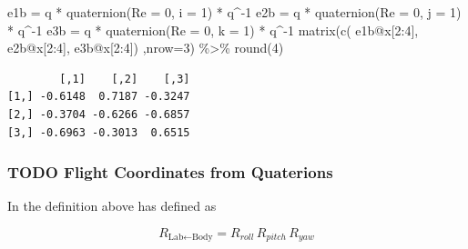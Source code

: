 \documentclass[
  letterpaper,
  DIV=11,
  numbers=noendperiod]{scrartcl}
\newenvironment{Shaded}{\begin{snugshade}}{\end{snugshade}}
\newcommand{\AttributeTok}[1]{\textcolor[rgb]{0.40,0.45,0.13}{#1}}
\newcommand{\DecValTok}[1]{\textcolor[rgb]{0.68,0.00,0.00}{#1}}
\newcommand{\FunctionTok}[1]{\textcolor[rgb]{0.28,0.35,0.67}{#1}}
\newcommand{\NormalTok}[1]{\textcolor[rgb]{0.00,0.23,0.31}{#1}}
\newcommand{\OtherTok}[1]{\textcolor[rgb]{0.00,0.23,0.31}{#1}}
\newcommand{\SpecialCharTok}[1]{\textcolor[rgb]{0.37,0.37,0.37}{#1}}
\begin{document}
\begin{Shaded}
\begin{Highlighting}[]
\NormalTok{ e1b }\OtherTok{=}\NormalTok{ q }\SpecialCharTok{*} \FunctionTok{quaternion}\NormalTok{(}\AttributeTok{Re =} \DecValTok{0}\NormalTok{, }\AttributeTok{i =} \DecValTok{1}\NormalTok{) }\SpecialCharTok{*}\NormalTok{ q}\SpecialCharTok{\^{}{-}}\DecValTok{1} 
\NormalTok{ e2b }\OtherTok{=}\NormalTok{ q }\SpecialCharTok{*} \FunctionTok{quaternion}\NormalTok{(}\AttributeTok{Re =} \DecValTok{0}\NormalTok{, }\AttributeTok{j =} \DecValTok{1}\NormalTok{) }\SpecialCharTok{*}\NormalTok{ q}\SpecialCharTok{\^{}{-}}\DecValTok{1} 
\NormalTok{ e3b }\OtherTok{=}\NormalTok{ q }\SpecialCharTok{*} \FunctionTok{quaternion}\NormalTok{(}\AttributeTok{Re =} \DecValTok{0}\NormalTok{, }\AttributeTok{k =} \DecValTok{1}\NormalTok{) }\SpecialCharTok{*}\NormalTok{ q}\SpecialCharTok{\^{}{-}}\DecValTok{1} 
 \FunctionTok{matrix}\NormalTok{(}\FunctionTok{c}\NormalTok{(}
\NormalTok{          e1b}\SpecialCharTok{@}\NormalTok{x[}\DecValTok{2}\SpecialCharTok{:}\DecValTok{4}\NormalTok{],}
\NormalTok{          e2b}\SpecialCharTok{@}\NormalTok{x[}\DecValTok{2}\SpecialCharTok{:}\DecValTok{4}\NormalTok{],}
\NormalTok{          e3b}\SpecialCharTok{@}\NormalTok{x[}\DecValTok{2}\SpecialCharTok{:}\DecValTok{4}\NormalTok{])}
\NormalTok{ ,}\AttributeTok{nrow=}\DecValTok{3}\NormalTok{) }\SpecialCharTok{\%\textgreater{}\%} \FunctionTok{round}\NormalTok{(}\DecValTok{4}\NormalTok{)}
\end{Highlighting}
\end{Shaded}

\begin{verbatim}
        [,1]    [,2]    [,3]
[1,] -0.6148  0.7187 -0.3247
[2,] -0.3704 -0.6266 -0.6857
[3,] -0.6963 -0.3013  0.6515
\end{verbatim}

\hypertarget{todo-flight-coordinates-from-quaterions}{%
\subsubsection{TODO Flight Coordinates from
Quaterions}\label{todo-flight-coordinates-from-quaterions}}

In the definition above has defined as

\[
  R_{\text{Lab} \leftarrow \text{Body}} =  R_{roll} \, R_{pitch}\, R_{yaw} 
\]
\end{document}

